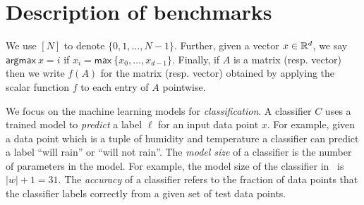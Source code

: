 \newpage

\section{Description of benchmarks}\label{app:benchmarks}
We use $[N]$ to denote $\{0,1,\dotsc, N-1\}$. Further, given a vector
$x\in{\mathbb{R}}^d$, we say $\mathsf{argmax}\ x = i$ if $x_i =
\mathsf{max}\ \{x_0,\ldots,x_{d-1}\}$. Finally, if $A$ is
a matrix (resp. vector) then we write $f(A)$ for the matrix (resp. vector)
obtained by applying the scalar function $f$ to each entry of $A$
pointwise.

We focus on the machine
learning models for {\it classification}. A classifier $C$ uses a
trained model to {\it predict} a
label $\ell$ for an input data point $x$. For example, given a
data point which is a tuple of humidity and temperature 
a classifier can predict a label ``will rain'' or ``will not rain''.
The {\it model size} of a classifier is the number of parameters in the model.
For example, the model size of the classifier in~ is $|w|+1=31$.
The {\it
  accuracy} of a classifier refers to the fraction of data points that
the classifier labels correctly from a given set of test data
points.


